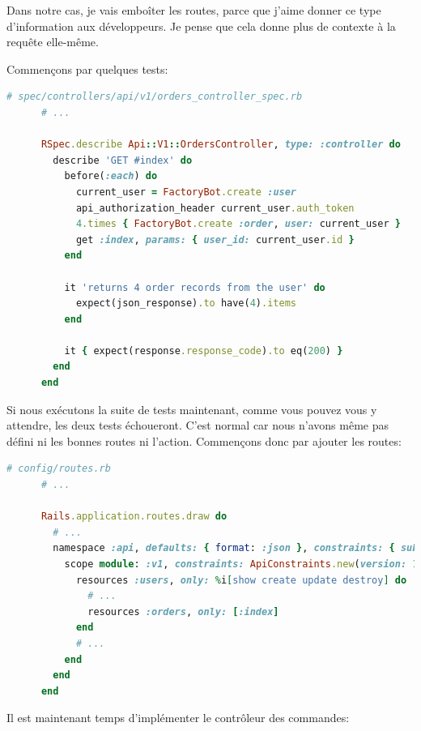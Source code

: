 \documentclass[]{report}
\begin{document}
    Dans notre cas, je vais emboîter les routes, parce que j'aime donner ce type d'information aux développeurs. Je pense que cela donne plus de contexte à la requête elle-même.

    Commençons par quelques tests:

    \begin{scriptsize}
      \begin{lstlisting}[language=ruby, caption={Test de l'affichage des commandes}]
      # spec/controllers/api/v1/orders_controller_spec.rb
      # ...

      RSpec.describe Api::V1::OrdersController, type: :controller do
        describe 'GET #index' do
          before(:each) do
            current_user = FactoryBot.create :user
            api_authorization_header current_user.auth_token
            4.times { FactoryBot.create :order, user: current_user }
            get :index, params: { user_id: current_user.id }
          end

          it 'returns 4 order records from the user' do
            expect(json_response).to have(4).items
          end

          it { expect(response.response_code).to eq(200) }
        end
      end
      \end{lstlisting}
    \end{scriptsize}

    Si nous exécutons la suite de tests maintenant, comme vous pouvez vous y attendre, les deux tests échoueront. C'est normal car nous n'avons même pas défini ni les bonnes routes ni l'action. Commençons donc par ajouter les routes:

    \begin{scriptsize}
      \begin{lstlisting}[language=ruby]
      # config/routes.rb
      # ...

      Rails.application.routes.draw do
        # ...
        namespace :api, defaults: { format: :json }, constraints: { subdomain: 'api' }, path: '/' do
          scope module: :v1, constraints: ApiConstraints.new(version: 1, default: true) do
            resources :users, only: %i[show create update destroy] do
              # ...
              resources :orders, only: [:index]
            end
            # ...
          end
        end
      end
      \end{lstlisting}
    \end{scriptsize}

    Il est maintenant temps d'implémenter le contrôleur des commandes:
\end{document}
